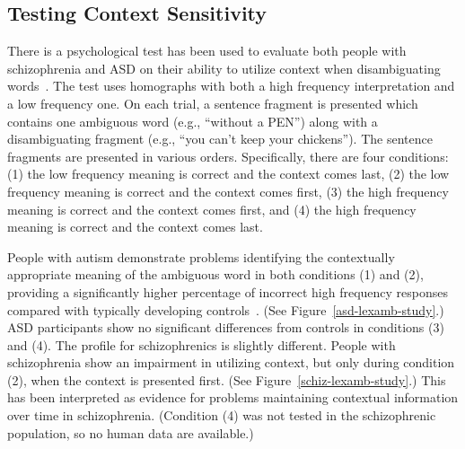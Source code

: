 \subsection{Testing Context Sensitivity}
There is a psychological test has been used to evaluate both people with schizophrenia and ASD on their ability to utilize context when disambiguating words~\cite{CohenJD:1992:Schizophrenia,HappeF:1997:WCC_Homographs}. The test uses homographs with both a high frequency interpretation and a low frequency one. On each trial, a sentence fragment is presented which contains one ambiguous word (e.g., ``without a PEN'') along with a disambiguating fragment (e.g., ``you can't keep your chickens''). The sentence fragments are presented in various orders. Specifically, there are four conditions: (1) the low frequency meaning is correct and the context comes last, (2) the low frequency meaning is correct and the context comes first, (3) the high frequency meaning is correct and the context comes first, and (4) the high frequency meaning is correct and the context comes last.

People with autism demonstrate problems identifying the contextually appropriate meaning of the ambiguous word in both conditions (1) and (2), providing a significantly higher percentage of incorrect high frequency responses compared with typically developing controls~\cite{HappeF:1997:WCC_Homographs}. (See Figure~\ref{asd-lexamb-study}.) ASD participants show no significant differences from controls in conditions (3) and (4). The profile for schizophrenics is slightly different. People with schizophrenia show an impairment in utilizing context, but only during condition (2), when the context is presented first. (See Figure~\ref{schiz-lexamb-study}.) This has been interpreted as evidence for problems maintaining contextual information over time in schizophrenia. (Condition (4) was not tested in the schizophrenic population, so no human data are available.)

